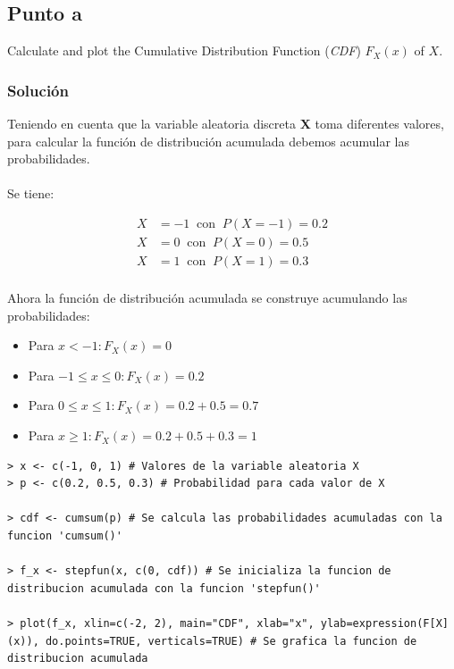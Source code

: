 \documentclass[12pt]{article}
\begin{document}
\subsection{Punto a}

Calculate and plot the Cumulative Distribution Function (\textit{CDF}) $F_{X} (x)$ of $X$.
\subsubsection{Solución}

Teniendo en cuenta que la variable aleatoria discreta \textbf{X} toma diferentes valores, para calcular la función de distribución acumulada debemos acumular las probabilidades.
\\
\\
Se tiene:

\begin{align*} 
X &= -1\ \text{ con }\ P(X=-1)=0.2 \\ 
X &= 0\ \text{ con }\ P(X=0)=0.5 \\
X &= 1\ \text{ con }\ P(X=1)=0.3 \\
\end{align*}


Ahora la función de distribución acumulada se construye acumulando las probabilidades:

\begin{itemize}
    \item Para $x < -1: F_X(x) = 0$
    \item Para $-1 \leq x \leq 0: F_X(x) = 0.2$
    \item Para $0 \leq x \leq 1: F_X(x) = 0.2 + 0.5 = 0.7$
    \item Para $x \geq 1: F_X(x) = 0.2 + 0.5 + 0.3 = 1$
\end{itemize}



\begin{lstlisting}
> x <- c(-1, 0, 1) # Valores de la variable aleatoria X
> p <- c(0.2, 0.5, 0.3) # Probabilidad para cada valor de X

> cdf <- cumsum(p) # Se calcula las probabilidades acumuladas con la funcion 'cumsum()'

> f_x <- stepfun(x, c(0, cdf)) # Se inicializa la funcion de distribucion acumulada con la funcion 'stepfun()'

> plot(f_x, xlin=c(-2, 2), main="CDF", xlab="x", ylab=expression(F[X](x)), do.points=TRUE, verticals=TRUE) # Se grafica la funcion de distribucion acumulada
\end{lstlisting}
\end{document}
